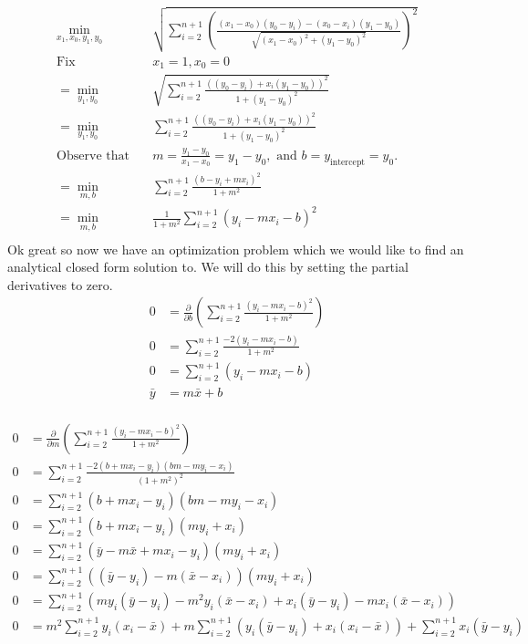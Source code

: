 \documentclass{article}
\begin{document}
\begin{align*}
\min_{x_1,x_0,y_1,y_0} & \sqrt{\sum_{i=2}^{n+1} \left( \frac{(x_1 - x_0)(y_0 - y_i) - (x_0 - x_i)(y_1 - y_0)}{\sqrt{(x_1 - x_0)^2 + (y_1 - y_0)^2}}\right)^2}\\
\text{Fix} \quad & x_1 = 1, x_0 = 0\\
 = \min_{y_1,y_0} & \sqrt{\sum_{i=2}^{n+1} \frac{((y_0 - y_i) + x_i(y_1 - y_0))^2}{1 + (y_1 - y_0)^2}}\\
= \min_{y_1,y_0} &\sum_{i=2}^{n+1} \frac{((y_0 - y_i) + x_i(y_1 - y_0))^2}{1 + (y_1 - y_0)^2}\\
\text{Observe that} \quad & m = \frac{y_1 - y_0}{x_1 - x_0} = y_1 - y_0, \text{ and } b = y_{\text{intercept}} = y_0.\\
= \min_{m,b} &\sum_{i=2}^{n+1} \frac{(b - y_i + mx_i)^2}{1 + m^2}\\
= \min_{m,b} &\frac{1}{1+m^2}\sum_{i=2}^{n+1}(y_i - mx_i - b)^2\\
\end{align*}
Ok great so now we have an optimization problem which we would like to find an analytical closed form solution to. We will do this by setting the partial derivatives to zero.
\begin{align*}
 0 & = \frac{\partial}{\partial b}\left(\sum_{i=2}^{n+1}\frac{(y_i - mx_i - b)^2}{1+m^2}\right)\\
 0 & = \sum_{i=2}^{n+1}\frac{-2(y_i - mx_i - b)}{1 + m^2}\\
 0 & = \sum_{i=2}^{n+1}(y_i - mx_i - b)\\
 \bar{y} & = m \bar{x} + b\\
\end{align*}

\begin{align*}
0 & = \frac{\partial}{\partial m}\left(\sum_{i=2}^{n+1}\frac{(y_i - mx_i - b)^2}{1+m^2}\right)\\
0 & = \sum_{i=2}^{n+1}\frac{-2(b + mx_i - y_i)(bm - my_i - x_i)}{(1+m^2)^2}\\
0 & = \sum_{i=2}^{n+1}(b + mx_i - y_i)(bm - my_i - x_i)\\
0 & = \sum_{i=2}^{n+1}(b + mx_i - y_i)(my_i + x_i)\\
0 & = \sum_{i=2}^{n+1}(\bar{y} - m\bar{x} + mx_i - y_i)(my_i + x_i)\\
0 & = \sum_{i=2}^{n+1}((\bar{y} -y_i)- m(\bar{x} - x_i))(my_i + x_i)\\
0 & = \sum_{i=2}^{n+1}(my_i(\bar{y} -y_i)- m^2y_i(\bar{x} - x_i) + x_i(\bar{y} -y_i) - mx_i(\bar{x} - x_i))\\
0 & = m^2\sum_{i=2}^{n+1}y_i(x_i - \bar{x}) + m\sum_{i=2}^{n+1}(y_i(\bar{y} -y_i) + x_i(x_i - \bar{x}))  + \sum_{i=2}^{n+1}x_i(\bar{y} -y_i)\\
\end{align*}
\end{document}
